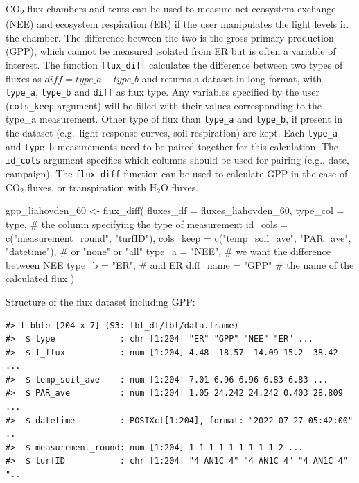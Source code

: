 \documentclass[
  letterpaper,
  DIV=11,
  numbers=noendperiod]{scrartcl}
\newenvironment{Shaded}{\begin{snugshade}}{\end{snugshade}}
\newcommand{\AttributeTok}[1]{\textcolor[rgb]{0.40,0.45,0.13}{#1}}
\newcommand{\CommentTok}[1]{\textcolor[rgb]{0.37,0.37,0.37}{#1}}
\newcommand{\FunctionTok}[1]{\textcolor[rgb]{0.28,0.35,0.67}{#1}}
\newcommand{\NormalTok}[1]{\textcolor[rgb]{0.00,0.23,0.31}{#1}}
\newcommand{\OtherTok}[1]{\textcolor[rgb]{0.00,0.23,0.31}{#1}}
\newcommand{\StringTok}[1]{\textcolor[rgb]{0.13,0.47,0.30}{#1}}
\begin{document}
CO\textsubscript{2} flux chambers and tents can be used to measure net
ecosystem exchange (NEE) and ecosystem respiration (ER) if the user
manipulates the light levels in the chamber. The difference between the
two is the gross primary production (GPP), which cannot be measured
isolated from ER but is often a variable of interest. The function
\texttt{flux\_diff} calculates the difference between two types of
fluxes as \(diff = type\_a - type\_b\) and returns a dataset in long
format, with \texttt{type\_a}, \texttt{type\_b} and \texttt{diff} as
flux type. Any variables specified by the user (\texttt{cols\_keep}
argument) will be filled with their values corresponding to the type\_a
measurement. Other type of flux than \texttt{type\_a} and
\texttt{type\_b}, if present in the dataset (e.g.~light response curves,
soil respiration) are kept. Each \texttt{type\_a} and \texttt{type\_b}
measurements need to be paired together for this calculation. The
\texttt{id\_cols} argument specifies which columns should be used for
pairing (e.g., date, campaign). The \texttt{flux\_diff} function can be
used to calculate GPP in the case of CO\(_2\) fluxes, or transpiration
with H\(_2\)O fluxes.

\begin{Shaded}
\begin{Highlighting}[]
\NormalTok{gpp\_liahovden\_60 }\OtherTok{\textless{}{-}} \FunctionTok{flux\_diff}\NormalTok{(}
  \AttributeTok{fluxes\_df =}\NormalTok{ fluxes\_liahovden\_60,}
  \AttributeTok{type\_col =}\NormalTok{ type, }\CommentTok{\# the column specifying the type of measurement}
  \AttributeTok{id\_cols =} \FunctionTok{c}\NormalTok{(}\StringTok{"measurement\_round"}\NormalTok{, }\StringTok{"turfID"}\NormalTok{),}
  \AttributeTok{cols\_keep =} \FunctionTok{c}\NormalTok{(}\StringTok{"temp\_soil\_ave"}\NormalTok{, }\StringTok{"PAR\_ave"}\NormalTok{, }\StringTok{"datetime"}\NormalTok{), }\CommentTok{\# or "none" or "all"}
  \AttributeTok{type\_a =} \StringTok{"NEE"}\NormalTok{, }\CommentTok{\# we want the difference between NEE}
  \AttributeTok{type\_b =} \StringTok{"ER"}\NormalTok{, }\CommentTok{\# and ER}
  \AttributeTok{diff\_name =} \StringTok{"GPP"} \CommentTok{\# the name of the calculated flux}
\NormalTok{  )}
\end{Highlighting}
\end{Shaded}

Structure of the flux dataset including GPP:

\begin{verbatim}
#> tibble [204 x 7] (S3: tbl_df/tbl/data.frame)
#>  $ type             : chr [1:204] "ER" "GPP" "NEE" "ER" ...
#>  $ f_flux           : num [1:204] 4.48 -18.57 -14.09 15.2 -38.42 ...
#>  $ temp_soil_ave    : num [1:204] 7.01 6.96 6.96 6.83 6.83 ...
#>  $ PAR_ave          : num [1:204] 1.05 24.242 24.242 0.403 28.809 ...
#>  $ datetime         : POSIXct[1:204], format: "2022-07-27 05:42:00" ..
#>  $ measurement_round: num [1:204] 1 1 1 1 1 1 1 1 1 2 ...
#>  $ turfID           : chr [1:204] "4 AN1C 4" "4 AN1C 4" "4 AN1C 4" "..
\end{verbatim}
\end{document}
